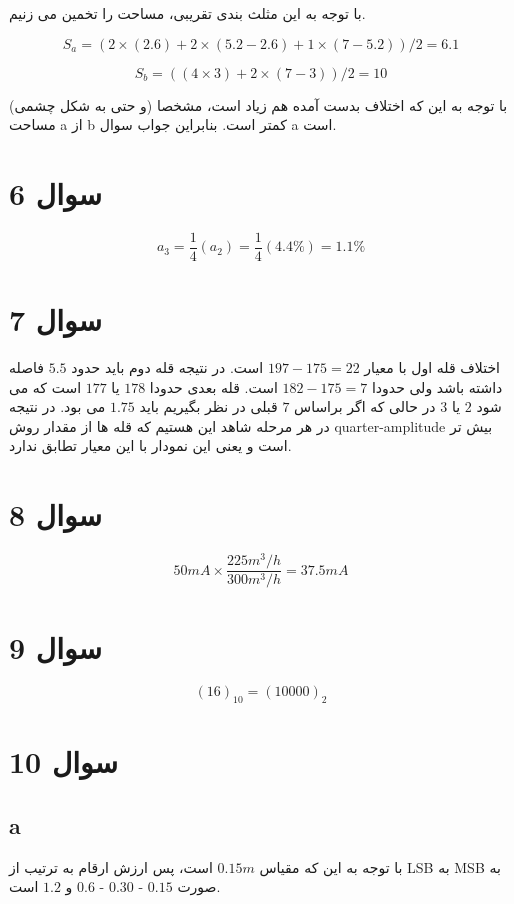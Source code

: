 \documentclass[12pt]{article}
\begin{document}
با توجه به این مثلث بندی تقریبی، مساحت را تخمین می زنیم.

$$S_a = (2 \times (2.6) + 2 \times (5.2 - 2.6) + 1 \times (7 - 5.2) ) /2 = 6.1$$

$$S_b =  ((4 \times 3) + 2 \times (7-3)) / 2 = 10$$

با توجه به این که اختلاف بدست آمده هم زیاد است، مشخصا (و حتی به شکل چشمی) مساحت a از b کمتر است. بنابراین جواب سوال a است.

\section*{سوال 6}

$$a_3 =  \frac{1}{4} (a_2) = \frac{1}{4} (4.4 \%) = 1.1 \%$$



\section*{سوال 7}

اختلاف قله اول با معیار
$197 - 175 = 22$
است. در نتیجه قله دوم باید حدود $5.5$ فاصله داشته باشد ولی حدودا
$182 - 175 = 7$
است. قله بعدی حدودا $178$ یا $177$ است که می شود $2$ یا $3$ در حالی که اگر براساس $7$ قبلی در نظر بگیریم باید $1.75$ می بود. در نتیجه در هر مرحله شاهد این هستیم که قله ها از مقدار روش quarter-amplitude بیش تر است و یعنی این نمودار با این معیار تطابق ندارد.


\section*{سوال 8}


$$50 mA \times \frac{225 m^3/h}{300 m^3/h} =  37.5 mA$$

\section*{سوال 9}

$$(16)_{10} = (10000)_2$$

\section*{سوال 10}

\subsection*{a}

با توجه به این که مقیاس $0.15m$ است، پس ارزش ارقام به ترتیب از LSB به MSB به صورت $0.15$ - $0.30$ - $0.6$ و $1.2$ است.
\end{document}
